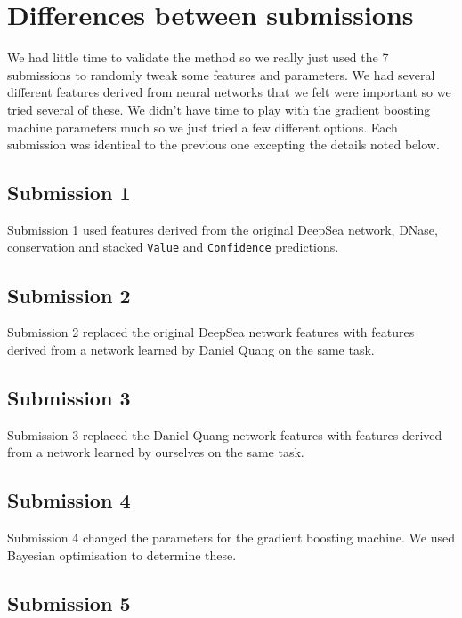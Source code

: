 \documentclass{article}
\begin{document}
\section*{Differences between submissions}

We had little time to validate the method so we really just used the 7 submissions
to randomly tweak some features and parameters.  We had several different
features derived from neural networks that we felt were important so we tried
several of these. We didn't have time to play with the gradient boosting machine
parameters much so we just tried a few different options.  Each submission was
identical to the previous one excepting the details noted below.

\subsection*{Submission 1}

Submission 1 used features derived from the original DeepSea network, DNase,
conservation and stacked \texttt{Value} and \texttt{Confidence} predictions.


\subsection*{Submission 2}

Submission 2 replaced the original DeepSea network features with features
derived from a network learned by Daniel Quang on the same task.


\subsection*{Submission 3}

Submission 3 replaced the Daniel Quang network features with features derived
from a network learned by ourselves on the same task.


\subsection*{Submission 4}

Submission 4 changed the parameters for the gradient boosting machine.  We used
Bayesian optimisation to determine these.


\subsection*{Submission 5}
\end{document}
